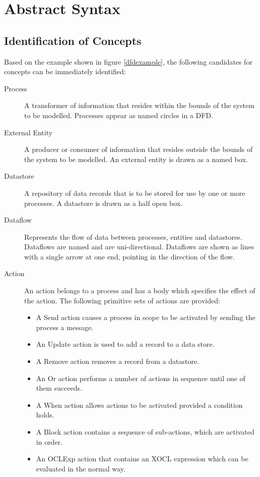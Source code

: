 \section{Abstract Syntax}

\subsection{Identification of Concepts}

Based on the example shown in figure \ref{dfdexample}, the
following candidates for concepts can be immediately identified:

\begin{description}
\item [Process]  A transformer of information that resides within
the bounds of the system to be modelled. Processes appear as named
circles in a DFD.

\item [External Entity] A producer or consumer of information that
resides outside the bounds of the system to be modelled. An external
entity is drawn as a named box.

\item [Datastore] A repository of data records that is to be stored
for use by one or more processes. A datastore is drawn as a half
open box.

\item [Dataflow] Represents the flow of data between processes,
entities and datastores. Dataflows are named and are uni-directional.
Dataflows are shown as lines with a single arrow at one end, pointing
in the direction of the flow.

\item [Action] An action belongs to a process and has a body which
specifies the effect of the action. The following primitive sets of actions are provided:
\begin{itemize}
\item A Send action causes a process in scope to be activated by sending the process a message.
\item An Update action is used to add a record to a data store.
\item A Remove action removes a record from a datastore.
\item An Or action performs a number of actions in sequence until one of them succeeds.
\item A When action allows actions to be activated provided a condition holds.
\item A Block action contains a sequence of sub-actions, which are activated in order.
\item An OCLExp action that contains an XOCL expression which can be evaluated in the normal way.
\end{itemize}

\end{description}

